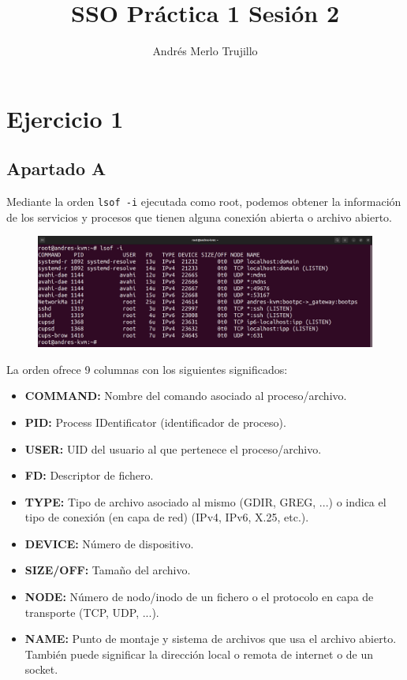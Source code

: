 \documentclass{article}
\title{SSO Práctica 1 Sesión 2}
\author{Andrés Merlo Trujillo}
\date{}
\begin{document}
\maketitle

\tableofcontents

\newpage
{}
\section*{Ejercicio 1}

\subsection*{Apartado A}
Mediante la orden \verb|lsof -i| ejecutada como root, podemos obtener la información de los servicios y procesos que tienen alguna conexión abierta o archivo abierto.

\begin{figure}[H]
    \includegraphics[width=\textwidth]{imagenes/lsofi.png}
\end{figure}

\bigskip

La orden ofrece 9 columnas con los siguientes significados:

\begin{itemize}
    \item \textbf{COMMAND: }Nombre del comando asociado al proceso/archivo.
    \item \textbf{PID: }Process IDentificator (identificador de proceso).
    \item \textbf{USER: }UID del usuario al que pertenece el proceso/archivo.
    \item \textbf{FD: }Descriptor de fichero.
    \item \textbf{TYPE: }Tipo de archivo asociado al mismo (GDIR, GREG, ...) o indica el tipo de conexión (en capa de red) (IPv4, IPv6, X.25, etc.).
    \item \textbf{DEVICE: }Número de dispositivo.
    \item \textbf{SIZE/OFF: }Tamaño del archivo.
    \item \textbf{NODE: }Número de nodo/inodo de un fichero o el protocolo en capa de transporte (TCP, UDP, ...).
    \item \textbf{NAME: }Punto de montaje y sistema de archivos que usa el archivo abierto. También puede significar la dirección local o remota de internet o de un socket.
\end{itemize}
\end{document}
